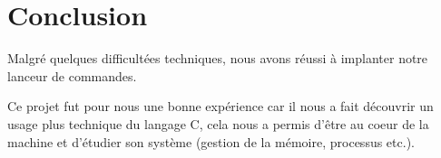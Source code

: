\section*{Conclusion}

Malgré quelques difficultées techniques, 
nous avons réussi à implanter notre lanceur de commandes. 

Ce projet fut pour nous une bonne expérience 
car il nous a fait découvrir un usage plus technique du langage C,
cela nous a permis d'être au coeur de la machine 
et d'étudier son système (gestion de la mémoire, processus etc.).

